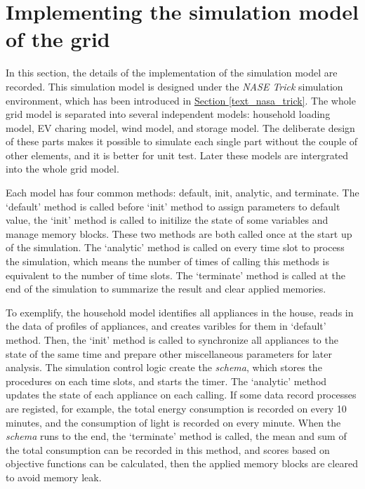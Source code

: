 \documentclass[12pt,a4paper]{report}
\begin{document}
            \section{Implementing the simulation model of the grid}
            
            In this section, the details of the implementation of the simulation model are recorded. This simulation model is designed under the \emph{NASE Trick} simulation environment, which has been introduced in \hyperref[text_nasa_trick]{Section \ref*{text_nasa_trick}}. The whole grid model is separated into several independent models: household loading model, EV charing model, wind model, and storage model. The deliberate design of these parts makes it possible to simulate each single part without the couple of other elements, and it is better for unit test. Later these models are intergrated into the whole grid model.
            
            Each model has four common methods: default, init, analytic, and terminate. The `default' method is called before `init' method to assign parameters to default value, the `init' method is called to initilize the state of some variables and manage memory blocks. These two methods are both called once at the start up of the simulation. The `analytic' method is called on every time slot to process the simulation, which means the number of times of calling this methods is equivalent to the number of time slots. The `terminate' method is called at the end of the simulation to summarize the result and clear applied memories.
            
            To exemplify, the household model identifies all appliances in the house, reads in the data of profiles of appliances, and creates varibles for them in `default' method. Then, the `init' method is called to synchronize all appliances to the state of the same time and prepare other miscellaneous parameters for later analysis. The simulation control logic create the \emph{schema}, which stores the procedures on each time slots, and starts the timer. The `analytic' method updates the state of each appliance on each calling. If some data record processes are registed, for example, the total energy consumption is recorded on every 10 minutes, and the consumption of light is recorded on every minute.
            When the \emph{schema} runs to the end, the `terminate' method is called, the mean and sum of the total consumption can be recorded in this method, and scores based on objective functions can be calculated, then the applied memory blocks are cleared to avoid memory leak.
\end{document}
